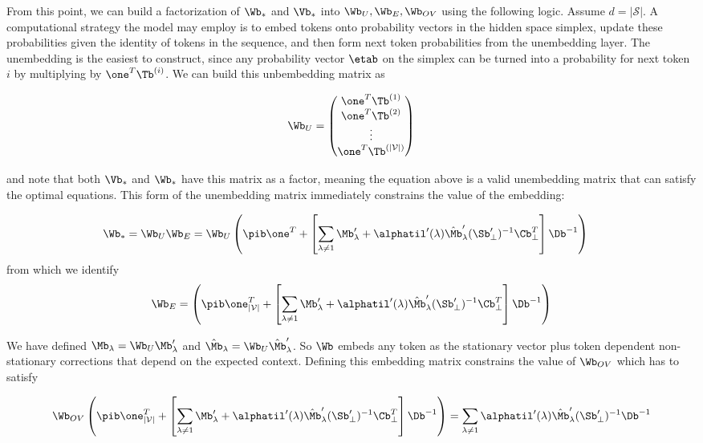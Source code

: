 \documentclass{article}
\begin{document}
From this point, we can build a factorization of $\Wb_*$ and $\Vb_*$ into $\Wb_U, \Wb_E, \Wb_{OV}$ using the following logic. Assume $d = |\mathcal{S}|$. A computational strategy the model may employ is to embed tokens onto probability vectors in the hidden space simplex, update these probabilities given the identity of tokens in the sequence, and then form next token probabilities from the unembedding layer. The unembedding is the easiest to construct, since any probability vector $\etab$ on the simplex can be turned into a probability for next token $i$ by multiplying by $\one^T \Tb^{(i)}$. We can build this unbembedding matrix as 

\begin{equation}
    \Wb_U = \begin{pmatrix}
        \one^T \Tb^{(1)} \\
        \one^T \Tb^{(2)} \\
        \vdots\\
        \one^T \Tb^{(|\mathcal{V}|)}
    \end{pmatrix}
\end{equation}

and note that both $\Vb_*$ and $\Wb_*$ have this matrix as a factor, meaning the equation above is a valid unembedding matrix that can satisfy the optimal equations. This form of the unembedding matrix immediately constrains the value of the embedding:

\begin{align}
    \Wb_* = \Wb_U \Wb_E &= \Wb_U \left (\pib \one^T + \left[ \sum_{\lambda \neq 1} \Mb'_\lambda + \alphatil'(\lambda) \hat{\Mb}'_\lambda (\Sb'_\perp)^{-1}\Cb_\perp^T\right ]  \Db^{-1}\right)
\end{align}
from which we identify 
\begin{align}
    \Wb_E = \left (\pib \one_{|\mathcal{V}|}^T + \left[ \sum_{\lambda \neq 1} \Mb'_\lambda + \alphatil'(\lambda) \hat{\Mb}'_\lambda (\Sb'_\perp)^{-1}\Cb_\perp^T\right ]  \Db^{-1}\right)
\end{align}

We have defined $\Mb_\lambda = \Wb_U \Mb_\lambda'$ and $\hat{\Mb}_\lambda = \Wb_U \hat{\Mb}_\lambda'$. So $\Wb$ embeds any token as the stationary vector plus token dependent non-stationary corrections that depend on the expected context. Defining this embedding matrix constrains the value of $\Wb_{OV}$ which has to satisfy 

\begin{equation}
    \Wb_{OV} \left (\pib \one_{|\mathcal{V}|}^T + \left[ \sum_{\lambda \neq 1} \Mb'_\lambda + \alphatil'(\lambda) \hat{\Mb}'_\lambda (\Sb'_\perp)^{-1}\Cb_\perp^T\right ]  \Db^{-1}\right) = \sum_{\lambda\neq 1} \alphatil'(\lambda) \hat{\Mb}'_\lambda (\Sb'_\perp)^{-1}\Db^{-1}
\end{equation}
\end{document}
